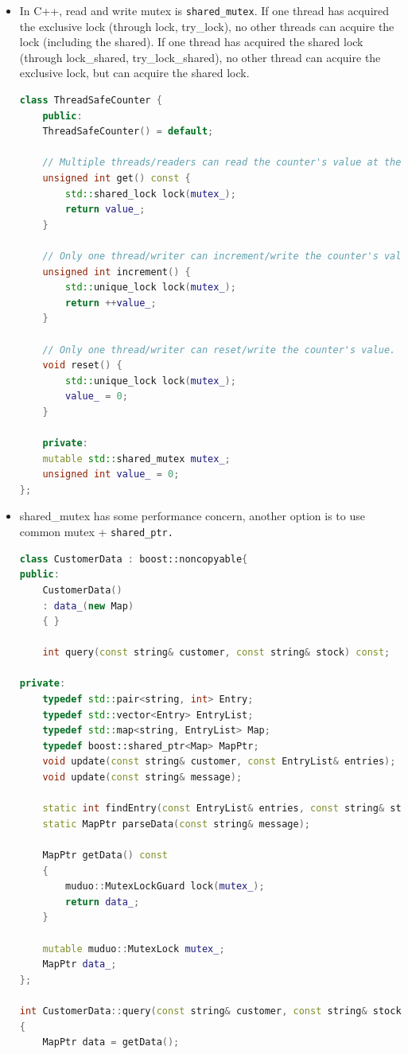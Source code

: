 \documentclass[a4paper,11pt,twoside]{book}
\begin{document}
\begin{itemize}
\item In C++, read and write mutex is \texttt{shared\_mutex}. If one thread has acquired the exclusive lock (through lock, try\_lock), no other threads can acquire the lock (including the shared). If one thread has acquired the shared lock (through lock\_shared, try\_lock\_shared), no other thread can acquire the exclusive lock, but can acquire the shared lock.
\begin{lstlisting}[frame=single, language=c++]	
class ThreadSafeCounter {
	public:
	ThreadSafeCounter() = default;
	
	// Multiple threads/readers can read the counter's value at the same time.
	unsigned int get() const {
		std::shared_lock lock(mutex_);
		return value_;
	}
	
	// Only one thread/writer can increment/write the counter's value.
	unsigned int increment() {
		std::unique_lock lock(mutex_);
		return ++value_;
	}
	
	// Only one thread/writer can reset/write the counter's value.
	void reset() {
		std::unique_lock lock(mutex_);
		value_ = 0;
	}
	
	private:
	mutable std::shared_mutex mutex_;
	unsigned int value_ = 0;
};	
\end{lstlisting}


\item shared\_mutex has some performance concern, another option is to use common mutex + \texttt{shared\_ptr.}
\begin{lstlisting}[frame=single, language=c++]	
class CustomerData : boost::noncopyable{
public:
	CustomerData()
	: data_(new Map)
	{ }
	
	int query(const string& customer, const string& stock) const;
	
private:
	typedef std::pair<string, int> Entry;
	typedef std::vector<Entry> EntryList;
	typedef std::map<string, EntryList> Map;
	typedef boost::shared_ptr<Map> MapPtr;
	void update(const string& customer, const EntryList& entries);
	void update(const string& message);
	
	static int findEntry(const EntryList& entries, const string& stock);
	static MapPtr parseData(const string& message);
	
	MapPtr getData() const
	{
		muduo::MutexLockGuard lock(mutex_);
		return data_;
	}
	
	mutable muduo::MutexLock mutex_;
	MapPtr data_;
};

int CustomerData::query(const string& customer, const string& stock) const
{
	MapPtr data = getData();
	

\end{lstlisting}
\end{itemize}
\end{document}
